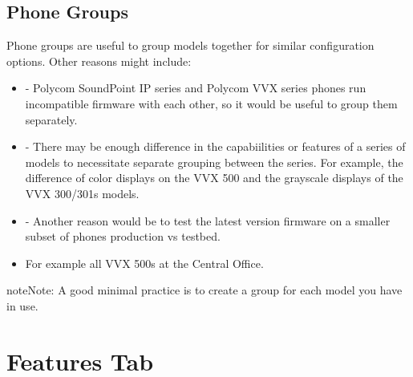 \documentclass[letterpaper,10pt,english]{sphinxmanual}
\begin{document}
\subsection{Phone Groups}
\label{\detokenize{webui:phone-groups}}\label{\detokenize{webui:id5}}
Phone groups are useful to group models together for similar configuration options. Other reasons might include:
\begin{itemize}
\item {} 
 - Polycom SoundPoint IP series and Polycom VVX series phones run incompatible firmware with each other, so it would be useful to group them separately.

\item {} 
 - There may be enough difference in the capabiilities or features of a series of models to necessitate separate grouping between the series. For example, the difference of color displays on the VVX 500 and the grayscale displays of the VVX 300/301s models.

\item {} 
 - Another reason would be to test the latest version firmware on a smaller subset of phones \textendash{} production vs testbed.

\item {} 
 \textendash{} For example all VVX 500s at the Central Office.

\end{itemize}


\begin{sphinxadmonition}{note}{Note:}
A good minimal practice is to create a group for each model you have in use.
\end{sphinxadmonition}


\section{Features Tab}
\label{\detokenize{webui:features-tab}}\label{\detokenize{webui:id6}}\begin{quote}

\end{quote}
\end{document}
